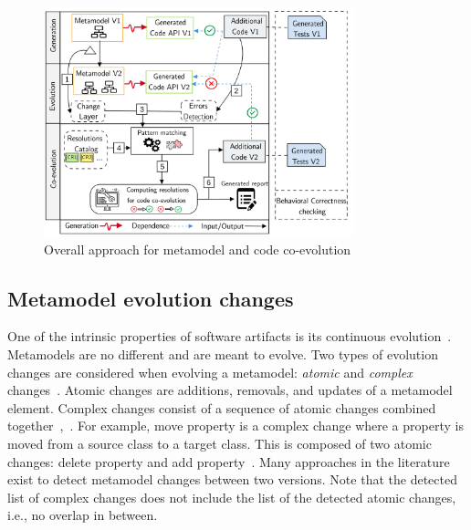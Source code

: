 \begin{figure}[t]\centering%
	\centering
	\includegraphics[width=0.8\textwidth]{./pics/chapter1pics/ApproachV5.png}
	\caption{Overall approach for metamodel and code co-evolution}
	\label{fig:overallapproach}
	\vspace{-1em}
\end{figure}
\subsection{Metamodel evolution changes}
\label{mmchanges}

One of the intrinsic properties of software artifacts is its continuous evolution~\cite{mens2008introduction}. Metamodels are no different and are meant to evolve. 
Two types of evolution changes are considered when evolving a metamodel: \emph{atomic} and \emph{complex} changes~\cite{Herrmannsdoerfer2011}. 
Atomic changes are additions, removals, and updates of a metamodel element. Complex changes consist of a sequence of atomic changes combined together~\cite{vermolen_reconstructing_2012},~\cite{khelladi2015detecting}. For example, move property is a complex change where a property is moved from a source class to a target class. This is composed of two atomic changes: delete property and add property~\cite{Herrmannsdoerfer2011}. 
Many approaches in the literature~\cite{Alter2015, williams2012searching,cicchetti_managing_2009,langer_posteriori_2013,vermolen_reconstructing_2012,Khelladi2016,bettini2022executable} exist to detect metamodel changes between two versions. Note that the detected list of complex changes does not include the list of the detected atomic changes, i.e., no overlap in between. 


